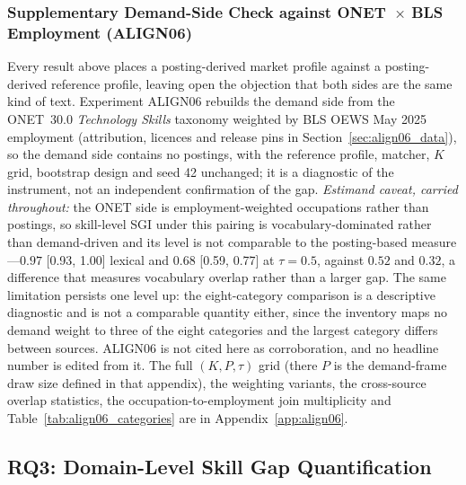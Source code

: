 \documentclass[journal]{IEEEtran}
\begin{document}
\subsubsection{Supplementary Demand-Side Check against O\*NET~$\times$ BLS Employment (ALIGN06)}
\label{sec:align06}

Every result above places a posting-derived market profile against a posting-derived reference profile, leaving open the objection that both sides are the same kind of text. Experiment ALIGN06 rebuilds the demand side from the O\*NET~30.0 \textit{Technology Skills} taxonomy weighted by BLS OEWS May 2025 employment (attribution, licences and release pins in Section~\ref{sec:align06_data}), so the demand side contains no postings, with the reference profile, matcher, $K$ grid, bootstrap design and seed 42 unchanged; it is a diagnostic of the instrument, not an independent confirmation of the gap. \emph{Estimand caveat, carried throughout:} the O\*NET side is employment-weighted occupations rather than postings, so skill-level SGI under this pairing is vocabulary-dominated rather than demand-driven and its level is not comparable to the posting-based measure---$0.97$ [0.93, 1.00] lexical and $0.68$ [0.59, 0.77] at $\tau = 0.5$, against $0.52$ and $0.32$, a difference that measures vocabulary overlap rather than a larger gap. The same limitation persists one level up: the eight-category comparison is a descriptive diagnostic and is not a comparable quantity either, since the inventory maps no demand weight to three of the eight categories and the largest category differs between sources. ALIGN06 is not cited here as corroboration, and no headline number is edited from it. The full $(K, P, \tau)$ grid (there $P$ is the demand-frame draw size defined in that appendix), the weighting variants, the cross-source overlap statistics, the occupation-to-employment join multiplicity and Table~\ref{tab:align06_categories} are in Appendix~\ref{app:align06}.

\subsection{RQ3: Domain-Level Skill Gap Quantification}
\end{document}
